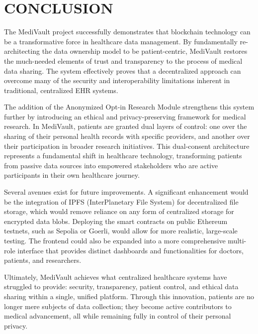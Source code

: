 \chapter{CONCLUSION}
\label{chap:conclusion}

The MediVault project successfully demonstrates that blockchain technology can be a transformative force in healthcare data management. By fundamentally re-architecting the data ownership model to be patient-centric, MediVault restores the much-needed elements of trust and transparency to the process of medical data sharing. The system effectively proves that a decentralized approach can overcome many of the security and interoperability limitations inherent in traditional, centralized EHR systems.

The addition of the Anonymized Opt-in Research Module strengthens this system further by introducing an ethical and privacy-preserving framework for medical research. In MediVault, patients are granted dual layers of control: one over the sharing of their personal health records with specific providers, and another over their participation in broader research initiatives. This dual-consent architecture represents a fundamental shift in healthcare technology, transforming patients from passive data sources into empowered stakeholders who are active participants in their own healthcare journey.

Several avenues exist for future improvements. A significant enhancement would be the integration of IPFS (InterPlanetary File System) for decentralized file storage, which would remove reliance on any form of centralized storage for encrypted data blobs. Deploying the smart contracts on public Ethereum testnets, such as Sepolia or Goerli, would allow for more realistic, large-scale testing. The frontend could also be expanded into a more comprehensive multi-role interface that provides distinct dashboards and functionalities for doctors, patients, and researchers.

Ultimately, MediVault achieves what centralized healthcare systems have struggled to provide: security, transparency, patient control, and ethical data sharing within a single, unified platform. Through this innovation, patients are no longer mere subjects of data collection; they become active contributors to medical advancement, all while remaining fully in control of their personal privacy.
